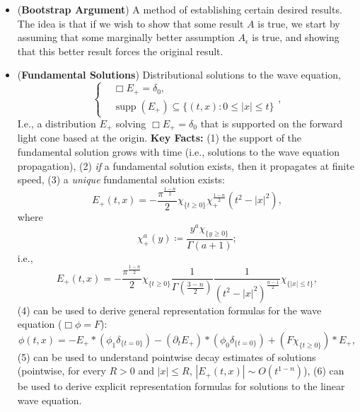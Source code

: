 \documentclass{article}
\begin{document}
\begin{itemize}
	\item (\textbf{Bootstrap Argument}) A method of establishing certain desired results. The idea is that if we wish to show that some result $A$ is true, we start by assuming that some marginally better assumption $A_{\epsilon}$ is true, and showing that this better result forces the original result. 
	
	\item (\textbf{Fundamental Solutions}) Distributional solutions to the wave equation, 
	\begin{equation*}
		\left\{
		\begin{alignedat}{1}
			&\Box E_{+} = \delta_{0},  \\
			&\operatorname{supp}(E_{+}) \subseteq \{(t, x): 0 \leq |x| \leq t\} 
		\end{alignedat}
		\right., 
	\end{equation*}  
	I.e., a distribution $E_{+}$ solving $\Box E_{+} = \delta_{0}$ that is supported on the forward light cone based at the origin. \textbf{Key Facts:} (1) the support of the fundamental solution grows with time (i.e., solutions to the wave equation propagation), (2) \textit{if} a fundamental solution exists, then it propagates at finite speed, (3) a \textit{unique} fundamental solution exists: 
		\begin{equation*}
			E_{+}(t, x) = - \frac{\pi^{\frac{1 - n}{2}}}{2}\chi_{\{t \geq 0\}}\chi_{+}^{\frac{1 - n}{2}}\left(t^{2} - |x|^{2}\right), 
		\end{equation*} 
		where 
		\begin{equation*}
			\chi_{+}^{a}(y) \coloneqq \frac{y^{a}\chi_{\{y \geq 0\}}}{\Gamma(a + 1)}; 
		\end{equation*} 
	i.e., 
		\begin{equation*}
			E_{+}(t, x) = -\frac{\pi^{\frac{1-n}{2}}}{2}\chi_{\{t \geq 0\}}\frac{1}{\Gamma(\frac{3 - n}{2})}\frac{1}{(t^{2} - |x|^{2})^{\frac{n- 1}{2}}}\chi_{\{|x| \leq t\}},
		\end{equation*} 
	(4) can be used to derive general representation formulas for the wave equation ($\Box\phi = F$): 
	\begin{equation*}
		\phi(t, x) = -E_{+} \ast (\phi_{1}\delta_{\{t = 0\}}) - (\partial_{t}E_{+}) \ast (\phi_{0}\delta_{\{t = 0\}}) + (F\chi_{\{t\geq 0\}}) \ast E_{+},
	\end{equation*}
	(5) can be used to understand pointwise decay estimates of solutions (pointwise, for every $R > 0$ and $|x| \leq R$, $|E_{+}(t, x)| \sim O(t^{1 - n})$), (6) can be used to derive explicit representation formulas for solutions to the linear wave equation. 
	

\end{itemize}
\end{document}
